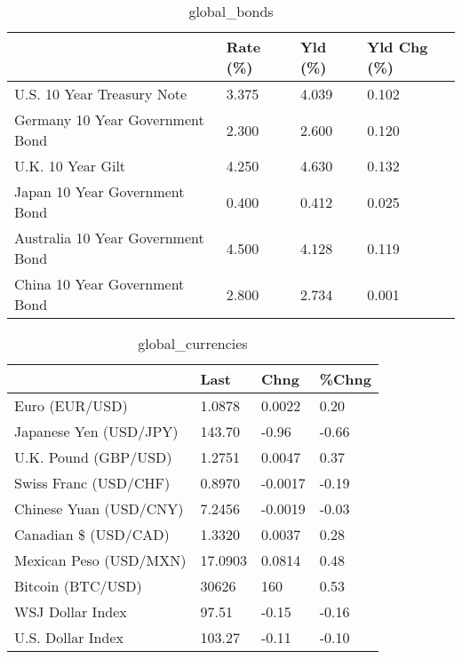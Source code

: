 \documentclass{article}%
\begin{document}
%


\begin{table}[htbp]%
\caption{global\_bonds}%
\centering%
\begin{adjustbox}{width=1\textwidth}%
\begin{tabular}{llll}
\toprule
                                  & Rate (\%) & Yld (\%) & Yld Chg (\%) \\
\midrule
       U.S. 10 Year Treasury Note &    3.375 &   4.039 &       0.102 \\
  Germany 10 Year Government Bond &    2.300 &   2.600 &       0.120 \\
                U.K. 10 Year Gilt &    4.250 &   4.630 &       0.132 \\
    Japan 10 Year Government Bond &    0.400 &   0.412 &       0.025 \\
Australia 10 Year Government Bond &    4.500 &   4.128 &       0.119 \\
    China 10 Year Government Bond &    2.800 &   2.734 &       0.001 \\
\bottomrule
\end{tabular}
%
\end{adjustbox}%
\end{table}

%


\begin{table}[htbp]%
\caption{global\_currencies}%
\centering%
\begin{adjustbox}{width=1\textwidth}%
\begin{tabular}{llll}
\toprule
                       &    Last &    Chng & \%Chng \\
\midrule
        Euro (EUR/USD) &  1.0878 &  0.0022 &  0.20 \\
Japanese Yen (USD/JPY) &  143.70 &   -0.96 & -0.66 \\
  U.K. Pound (GBP/USD) &  1.2751 &  0.0047 &  0.37 \\
 Swiss Franc (USD/CHF) &  0.8970 & -0.0017 & -0.19 \\
Chinese Yuan (USD/CNY) &  7.2456 & -0.0019 & -0.03 \\
  Canadian \$ (USD/CAD) &  1.3320 &  0.0037 &  0.28 \\
Mexican Peso (USD/MXN) & 17.0903 &  0.0814 &  0.48 \\
     Bitcoin (BTC/USD) &   30626 &     160 &  0.53 \\
      WSJ Dollar Index &   97.51 &   -0.15 & -0.16 \\
     U.S. Dollar Index &  103.27 &   -0.11 & -0.10 \\
\bottomrule
\end{tabular}
%
\end{adjustbox}%
\end{table}
\end{document}
